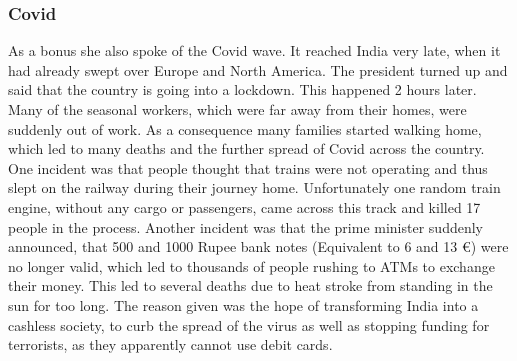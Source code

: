 \documentclass{article}
\begin{document}
	\subsubsection{Covid}
	As a bonus she also spoke of the Covid wave. It reached India very late, when it had already swept over Europe and North America. The president turned up and said that the country is going into a lockdown. This happened 2 hours later. Many of the seasonal workers, which were far away from their homes, were suddenly out of work. As a consequence many families started walking home, which led to many deaths and the further spread of Covid across the country. One incident was that people thought that trains were not operating and thus slept on the railway during their journey home. Unfortunately one random train engine, without any cargo or passengers, came across this track and killed 17 people in the process. Another incident was that the prime minister suddenly announced, that 500 and 1000 Rupee bank notes (Equivalent to 6 and 13 €) were no longer valid, which led to thousands of people rushing to ATMs to exchange their money. This led to several deaths due to heat stroke from standing in the sun for too long. The reason given was the hope of transforming India into a cashless society, to curb the spread of the virus as well as stopping funding for terrorists, as they apparently cannot use debit cards.
	
	 


	
	
	
























	
\end{document}

